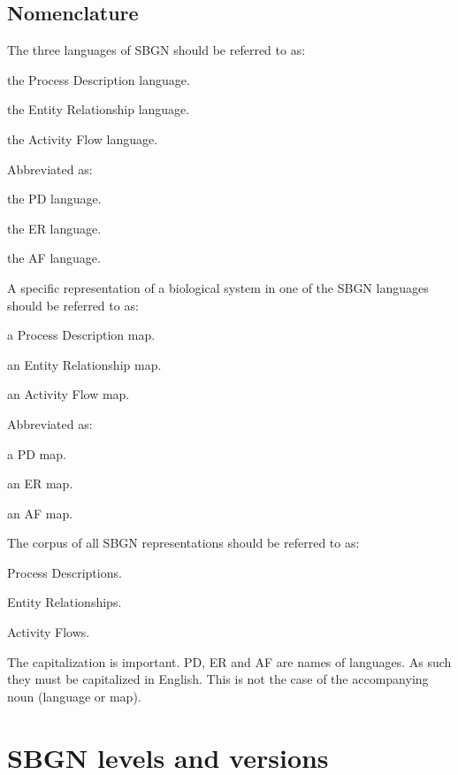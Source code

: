 \subsection{Nomenclature}

The three languages of SBGN should be referred to as:
\begin{compactitem}
\item the Process Description language.
\item the Entity Relationship language.
\item the Activity Flow language.
\end{compactitem}

Abbreviated as:
\begin{compactitem}
\item the PD language.
\item the ER language.
\item the AF language.
\end{compactitem}

A specific representation of a biological system in one of the SBGN languages should be referred to as:
\begin{compactitem}
\item a Process Description map.
\item an Entity Relationship map.
\item an Activity Flow map.
\end{compactitem}

Abbreviated as:
\begin{compactitem}
\item a PD map.
\item an ER map.
\item an AF map.
\end{compactitem}

The corpus of all SBGN representations should be referred to as:
\begin{compactitem}
\item Process Descriptions.
\item Entity Relationships.
\item Activity Flows.
\end{compactitem}

 The capitalization is important. PD, ER and AF are names of languages. As such they must be capitalized in English. This is not the case of the accompanying noun (language or map).

\section{SBGN levels and versions}
\label{sec:sbgn-levels}


